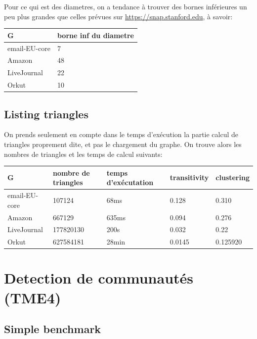 \documentclass[a4paper]{report}
\begin{document}
Pour ce qui est des diametres, on a tendance à trouver des bornes inférieures un peu plus grandes que celles prévues sur \url{https://snap.stanford.edu}, à savoir:
\begin{center}
  \begin{tabular}{|l|l|}
    \hline
    G & borne inf du diametre \\
    \hline
    email-EU-core & 7\\
    Amazon & 48\\
    LiveJournal & 22\\
    Orkut & 10\\
    \hline
  \end{tabular}
\end{center}

\section{Listing triangles}
On prends seulement en compte dans le temps d'exécution la partie calcul de triangles proprement dite, et pas le chargement du graphe. On trouve alors les nombres de triangles et les temps de calcul suivants:\\
\begin{center}
  \begin{tabular}{|l|l|l|l|l|}
    \hline
    G & nombre de triangles & temps d'exécutation & transitivity & clustering\\
    \hline
    email-EU-core & 107124 & 68ms & 0.128 & 0.310\\
    Amazon & 667129 & 635ms & 0.094 & 0.276\\
    LiveJournal & 177820130 & 200s & 0.032 & 0.22\\
    Orkut & 627584181 & 28min & 0.0145 & 0.125920\\
    \hline
  \end{tabular}
\end{center}

\chapter{Detection de communautés (TME4)}

\section{Simple benchmark}
\end{document}
